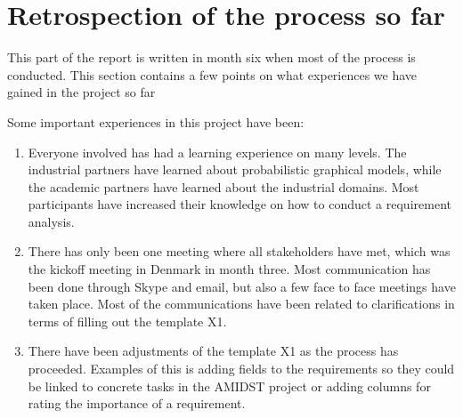 \documentclass[11pt, oneside]{article}   	%
\begin{document}
\section{Retrospection of the process so far}
\label{sec:retrospection}

This part of the report is written in month six when most of the process is conducted.  This section contains a few points on what experiences we have gained in the project so far

Some important experiences in this project have been:

\begin{enumerate}
\item Everyone involved has had a learning experience on many levels.  The industrial partners have learned about probabilistic graphical models, while the academic partners have learned about the industrial domains.  Most participants have increased their knowledge on how to conduct a requirement analysis. 
\item There has only been one meeting where all stakeholders have met, which was the kickoff meeting in Denmark in month three.  Most communication has been done through Skype and email, but also a few face to face meetings have taken place. Most of the communications have been related to clarifications in terms of filling out the template X1.
\item There have been adjustments of the template X1 as the process has proceeded.  Examples of this is adding fields to the requirements so they could be linked to concrete tasks in the AMIDST project or adding columns for rating the importance of a requirement.
\end{enumerate}





\end{document}
